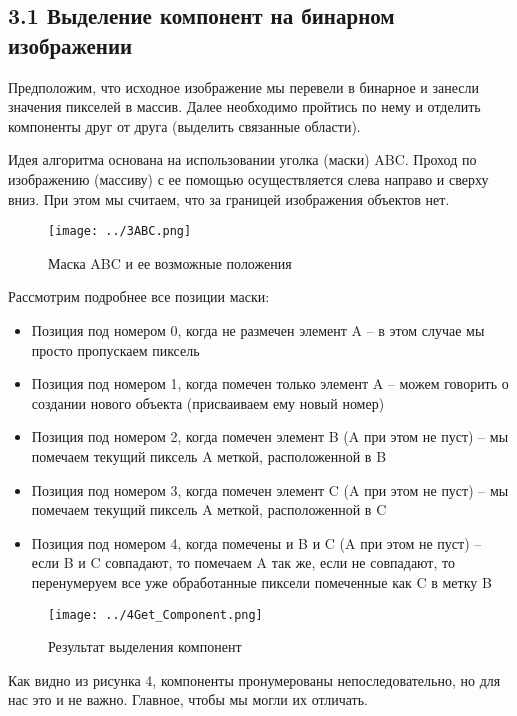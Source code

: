 \documentclass{report}
\begin{document}
\subsection*{3.1 Выделение компонент на бинарном изображении}
\par Предположим, что исходное изображение мы перевели в бинарное и занесли значения пикселей в массив. Далее необходимо пройтись по нему и отделить компоненты друг от друга (выделить связанные области). 
\par Идея алгоритма основана на использовании уголка (маски) ABC. Проход по изображению (массиву) с ее помощью осуществляется слева направо и сверху вниз. При этом мы считаем, что за границей изображения объектов нет.
\begin{figure}[htbp]
  \centering
  \texttt{[image: ../3ABC.png]}
  \caption{Маска ABC и ее возможные положения}\label{fig:../3ABC.png}
\end{figure}
\par Рассмотрим подробнее все позиции маски:
\begin{itemize}
\item Позиция под номером 0, когда не размечен элемент A – в этом случае мы просто пропускаем пиксель
\item Позиция под номером 1, когда помечен только элемент A – можем говорить о создании нового объекта (присваиваем ему новый номер)
\item Позиция под номером 2, когда помечен элемент B (A при этом не пуст) – мы помечаем текущий пиксель A меткой, расположенной в B
\item Позиция под номером 3, когда помечен элемент C (A при этом не пуст) – мы помечаем текущий пиксель A меткой, расположенной в C
\item Позиция под номером 4, когда помечены и B и C (A при этом не пуст) – если B и C совпадают, то помечаем A так же, если не совпадают, то перенумеруем все уже обработанные пиксели помеченные как C в метку B
\end{itemize}
\begin{figure}[htbp]
  \centering
  \texttt{[image: ../4Get\_Component.png]}
  \caption{Результат выделения компонент}\label{fig:../4Get_Component.png}
\end{figure}
\par Как видно из рисунка 4, компоненты пронумерованы непоследовательно, но для нас это и не важно. Главное, чтобы мы могли их отличать.
\end{document}
